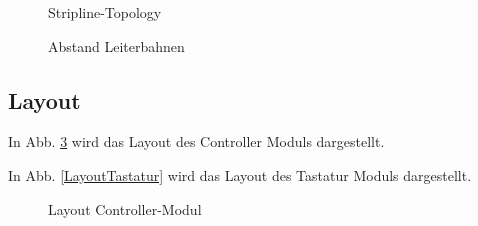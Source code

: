\begin{figure}[H]
    \centering    
    \caption{Stripline-Topology}
    \label{Stripline}
\end{figure}

\begin{figure}[H]
    \centering    
    \caption{Abstand Leiterbahnen}
    \label{AbstandLeiterbahnen}
\end{figure}


\subsection{Layout}

In Abb. \ref{LayoutController} wird das Layout des Controller Moduls dargestellt.

In Abb. \ref{LayoutTastatur} wird das Layout des Tastatur Moduls dargestellt. 

\begin{figure}[H]
	\centering    
	\caption{Layout Controller-Modul}
	\label{LayoutController}
\end{figure}

